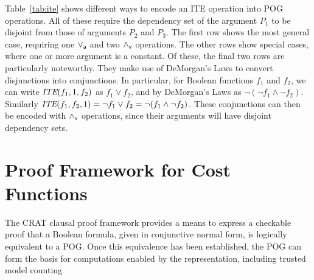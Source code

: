 \documentclass{llncs}
\newcommand{\pand}{\mathbin{\land_{\sf v}}}
\newcommand{\por}{\mathbin{\lor_{\sf a}}}
\newcommand{\tautology}{1}
\newcommand{\ite}{\mbox{\it ITE}}
\begin{document}
Table~\ref{tab:ite} shows different ways to encode an ITE operation
into POG operations.  All of these require the dependency set of
the argument $P_1$ to be disjoint from those of arguments $P_2$ and
$P_3$.  The first row shows the most general case, requiring one
$\por$ and two $\pand$ operations.  The other rows show special cases,
where one or more argument is a constant.  Of these, the final two
rows are particularly noteworthy.  They make use of DeMorgan's Laws to
convert disjunctions into conjunctions.  In particular, for Boolean
functions $f_1$ and $f_2$, we can write $\ite(f_1, \tautology, f_2)$
as $f_1 \lor f_2$, and by DeMorgan's Laws as $\neg(\neg f_1 \land
\neg f_2)$.  Similarly $\ite(f_1, f_2, \tautology) = \neg f_1 \lor f_2 = \neg(f_1 \land \neg f_2)$.
These conjunctions can then be
encoded with $\pand$ operations, since their arguments will have
disjoint dependency sets.

\section{Proof Framework for Cost Functions}

The CRAT clausal proof framework provides a means to express a
checkable proof that a Boolean formula, given in conjunctive normal
form, is logically equivalent to a POG\@.  Once this
equivalence has been established, the POG can form the basis
for computations enabled by the
representation, including trusted model counting 
\end{document}
